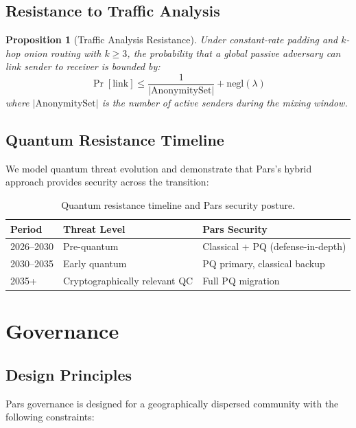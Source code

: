 \documentclass[11pt,a4paper,twocolumn]{article}
\newtheorem{proposition}[theorem]{Proposition}
\begin{document}
\subsection{Resistance to Traffic Analysis}

\begin{proposition}[Traffic Analysis Resistance]
Under constant-rate padding and $k$-hop onion routing with $k \geq 3$, the probability that a global passive adversary can link sender to receiver is bounded by:
$$\Pr[\text{link}] \leq \frac{1}{|\text{AnonymitySet}|} + \text{negl}(\lambda)$$
where $|\text{AnonymitySet}|$ is the number of active senders during the mixing window.
\end{proposition}

\subsection{Quantum Resistance Timeline}

We model quantum threat evolution and demonstrate that Pars's hybrid approach provides security across the transition:

\begin{table}[H]
\centering
\caption{Quantum resistance timeline and Pars security posture.}
\label{tab:quantum-timeline}
\begin{tabularx}{\columnwidth}{lXX}
\toprule
\textbf{Period} & \textbf{Threat Level} & \textbf{Pars Security} \\
\midrule
2026--2030 & Pre-quantum & Classical + PQ (defense-in-depth) \\
2030--2035 & Early quantum & PQ primary, classical backup \\
2035+ & Cryptographically relevant QC & Full PQ migration \\
\bottomrule
\end{tabularx}
\end{table}

\section{Governance}
\label{sec:governance}

\subsection{Design Principles}

Pars governance is designed for a geographically dispersed community with the following constraints:
\end{document}

